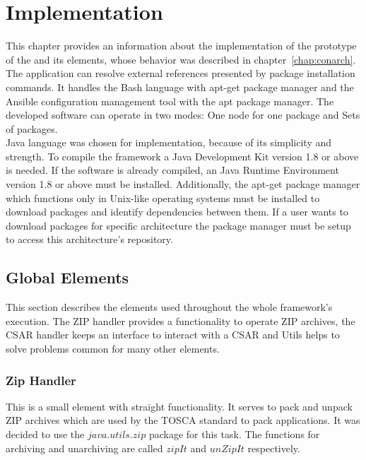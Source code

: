 
\chapter{Implementation}\label{chap:imp}
This chapter provides an information about the implementation of the prototype of the and its elements, whose behavior was described in chapter~\ref{chap:conarch}.
The application can resolve external references presented by package installation commands.
It handles the Bash language with apt-get package manager and the Ansible configuration management tool with the apt package manager.
The developed software can operate in two modes: One node for one package and Sets of packages.\\
Java language was chosen for implementation, because of its simplicity and strength. 
To compile the framework a Java Development Kit version 1.8 or above is needed.
If the software is already compiled, an Java Runtime Environment version 1.8 or above must be installed.
Additionally, the apt-get package manager which functions only in Unix-like operating systems must be installed to download packages and identify dependencies between them. 
If a user wants to download packages for specific architecture the package manager must be setup to access this architecture's repository. 

%



\section{Global Elements}
This section describes the elements used throughout the whole framework's execution.
The ZIP handler provides a functionality to operate ZIP archives, the CSAR handler keeps an interface to interact with a CSAR and Utils helps to solve problems common for many other elements.

\subsection*{Zip Handler}
This is a small element with straight functionality. 
It serves to pack and unpack ZIP archives which are used by the TOSCA standard to pack applications.
It was decided to use the $java$.$utils$.$zip$ package for this task.
The functions for archiving and unarchiving are called $zipIt$ and $unZipIt$ respectively. 

